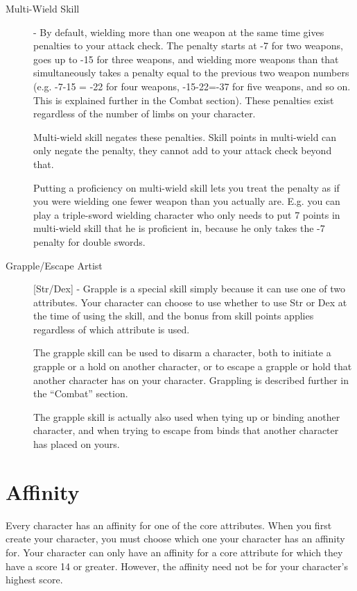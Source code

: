 \begin{description}
\item[Multi-Wield Skill] - By default, wielding more than one weapon at the same time gives penalties to your attack check. The penalty starts at -7 for two weapons, goes up to -15 for three weapons, and wielding more weapons than that simultaneously takes a penalty equal to the previous two weapon numbers (e.g. -7-15 = -22 for four weapons, -15-22=-37 for five weapons, and so on. This is explained further in the Combat section). These penalties exist regardless of the number of limbs on your character.

Multi-wield skill negates these penalties. Skill points in multi-wield can only negate the penalty, they cannot add to your attack check beyond that.

Putting a proficiency on multi-wield skill lets you treat the penalty as if you were wielding one fewer weapon than you actually are. E.g. you can play a triple-sword wielding character who only needs to put 7 points in multi-wield skill that he is proficient in, because he only takes the -7 penalty for double swords.

\item[Grapple/Escape Artist] [Str/Dex] - Grapple is a special skill simply because it can use one of two attributes. Your character can choose to use whether to use Str or Dex at the time of using the skill, and the bonus from skill points applies regardless of which attribute is used.

The grapple skill can be used to disarm a character, both to initiate a grapple or a hold on another character, or to escape a grapple or hold that another character has on your character. Grappling is described further in the ``Combat'' section.

The grapple skill is actually also used when tying up or binding another character, and when trying to escape from binds that another character has placed on yours.
\end{description}

\section{Affinity}
Every character has an affinity for one of the core attributes. When you first create your character, you must choose which one your character has an affinity for. Your character can only have an affinity for a core attribute for which they have a score 14 or greater. However, the affinity need not be for your character’s highest score.

